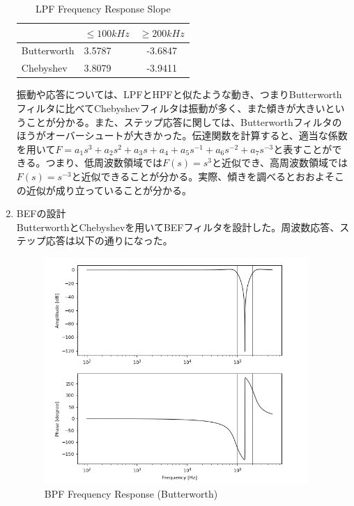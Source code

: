 \documentclass[a4j,dvipdfmx]{article}
\begin{document}
\begin{enumerate}[label={(\arabic*)}]
\begin{table}[H]
    \begin{center}
        \begin{tabular}{|l|l|c|} \hline
        	& $\leq 100kHz$ & $\geq200kHz$\\ \hline
            Butterworth & 3.5787 & -3.6847\\ \hline
            Chebyshev & 3.8079 & -3.9411\\ \hline
        \end{tabular}
        \caption{LPF Frequency Response Slope}
    \end{center}
\end{table}

振動や応答については、LPFとHPFと似たような動き、つまりButterworthフィルタに比べてChebyshevフィルタは振動が多く、また傾きが大きいということが分かる。また、ステップ応答に関しては、Butterworthフィルタのほうがオーバーシュートが大きかった。伝達関数を計算すると、適当な係数を用いて$F=a_1s^3+a_2s^2+a_3s+a_4+a_5s^{-1}+a_6s^{-2}+a_7s^{-3}$と表すことができる。つまり、低周波数領域では$F(s) = s^3$と近似でき、高周波数領域では$F(s) = s^{-3}$と近似できることが分かる。実際、傾きを調べるとおおよそこの近似が成り立っていることが分かる。

\item BEFの設計\\
ButterworthとChebyshevを用いてBEFフィルタを設計した。周波数応答、ステップ応答は以下の通りになった。

\begin{figure}[H]
    \begin{center}
     	\includegraphics[width=10cm]{BEF_B_f.png}
        \caption{BPF Frequency Response (Butterworth)}
    \end{center}
\end{figure}


\end{enumerate}
\end{document}
